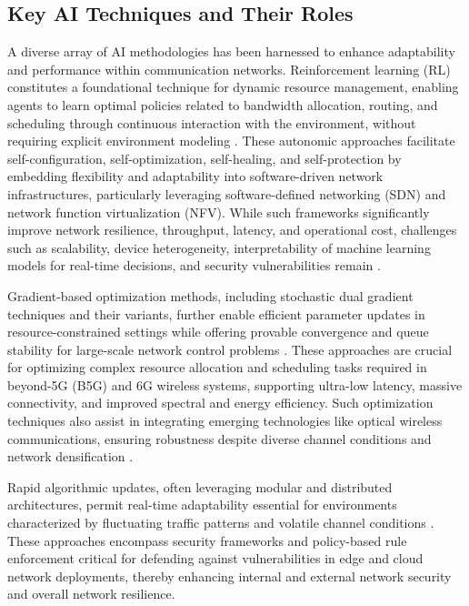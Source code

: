 \documentclass[sigconf]{acmart}
\begin{document}
\subsection{Key AI Techniques and Their Roles}

A diverse array of AI methodologies has been harnessed to enhance adaptability and performance within communication networks. Reinforcement learning (RL) constitutes a foundational technique for dynamic resource management, enabling agents to learn optimal policies related to bandwidth allocation, routing, and scheduling through continuous interaction with the environment, without requiring explicit environment modeling \cite{ref11,ref12}. These autonomic approaches facilitate self-configuration, self-optimization, self-healing, and self-protection by embedding flexibility and adaptability into software-driven network infrastructures, particularly leveraging software-defined networking (SDN) and network function virtualization (NFV). While such frameworks significantly improve network resilience, throughput, latency, and operational cost, challenges such as scalability, device heterogeneity, interpretability of machine learning models for real-time decisions, and security vulnerabilities remain \cite{ref11}. 

Gradient-based optimization methods, including stochastic dual gradient techniques and their variants, further enable efficient parameter updates in resource-constrained settings while offering provable convergence and queue stability for large-scale network control problems \cite{ref13,ref14}. These approaches are crucial for optimizing complex resource allocation and scheduling tasks required in beyond-5G (B5G) and 6G wireless systems, supporting ultra-low latency, massive connectivity, and improved spectral and energy efficiency. Such optimization techniques also assist in integrating emerging technologies like optical wireless communications, ensuring robustness despite diverse channel conditions and network densification \cite{ref14}.

Rapid algorithmic updates, often leveraging modular and distributed architectures, permit real-time adaptability essential for environments characterized by fluctuating traffic patterns and volatile channel conditions \cite{ref15}. These approaches encompass security frameworks and policy-based rule enforcement critical for defending against vulnerabilities in edge and cloud network deployments, thereby enhancing internal and external network security and overall network resilience.
\end{document}
